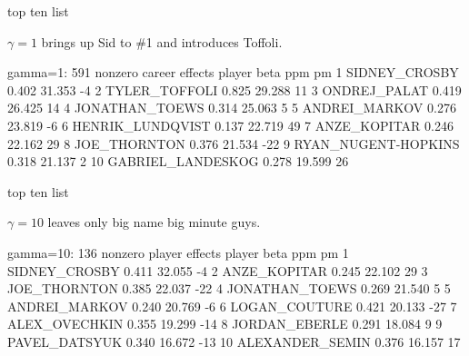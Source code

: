 \documentclass[11pt,xcolor=svgnames]{beamer}
\newcommand{\theme}{\color{Maroon}}
\newcommand{\gr}{\color{black!60}}
\newcommand{\nv}{\color{Navy}}
\begin{document}
\begin{frame}[fragile]{top ten list}

$\gamma=1$ brings up Sid to \#1 and introduces Toffoli.

\begin{semiverbatim}\nv{}
  gamma=1: 591 nonzero career effects
                 player  beta    ppm  pm
 1        SIDNEY_CROSBY 0.402 31.353  -4
 2        TYLER_TOFFOLI 0.825 29.288  11
 3         ONDREJ_PALAT 0.419 26.425  14
 4       JONATHAN_TOEWS 0.314 25.063   5
 5        ANDREI_MARKOV 0.276 23.819  -6
 6     HENRIK_LUNDQVIST 0.137 22.719  49
 7         ANZE_KOPITAR 0.246 22.162  29
 8         JOE_THORNTON 0.376 21.534 -22
 9  RYAN_NUGENT-HOPKINS 0.318 21.137   2
 10   GABRIEL_LANDESKOG 0.278 19.599  26
\end{semiverbatim}

\end{frame}


\begin{frame}[fragile]{top ten list}

$\gamma=10$ leaves only big name big minute guys.

\begin{semiverbatim}\nv{}
 gamma=10: 136 nonzero player effects
             player  beta    ppm  pm
 1    SIDNEY_CROSBY 0.411 32.055  -4
 2     ANZE_KOPITAR 0.245 22.102  29
 3     JOE_THORNTON 0.385 22.037 -22
 4   JONATHAN_TOEWS 0.269 21.540   5
 5    ANDREI_MARKOV 0.240 20.769  -6
 6    LOGAN_COUTURE 0.421 20.133 -27
 7    ALEX_OVECHKIN 0.355 19.299 -14
 8    JORDAN_EBERLE 0.291 18.084   9
 9    PAVEL_DATSYUK 0.340 16.672 -13
 10 ALEXANDER_SEMIN 0.376 16.157  17
\end{semiverbatim}

\end{frame}

\end{document}
